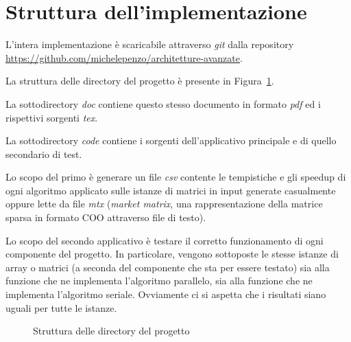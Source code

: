 
\section{Struttura dell'implementazione}\label{struttura}

L'intera implementazione è scaricabile attraverso \emph{git} dalla repository \url{https://github.com/michelepenzo/architetture-avanzate}.

La struttura delle directory del progetto è presente in Figura~\ref{fig:struct}. 

La sottodirectory \emph{doc} contiene questo stesso documento in formato \emph{pdf} ed i rispettivi sorgenti \emph{tex}. 

La sottodirectory \emph{code} contiene i sorgenti dell'applicativo principale e di quello secondario di test. 

Lo scopo del primo è generare un file \emph{csv} contente le tempistiche e gli speedup di ogni algoritmo applicato sulle istanze di matrici in input generate casualmente oppure lette da file \emph{mtx} (\emph{market matrix}, una rappresentazione della matrice sparsa in formato COO attraverso file di testo). 

Lo scopo del secondo applicativo è testare il corretto funzionamento di ogni componente del progetto. In particolare, vengono sottoposte le stesse istanze di array o matrici (a seconda del componente che sta per essere testato) sia alla funzione che ne implementa l'algoritmo parallelo, sia alla funzione che ne implementa l'algoritmo seriale. Ovviamente ci si aspetta che i risultati siano uguali per tutte le istanze.

\begin{figure}
    \caption{Struttura delle directory del progetto}
    \label{fig:struct}
\end{figure}

